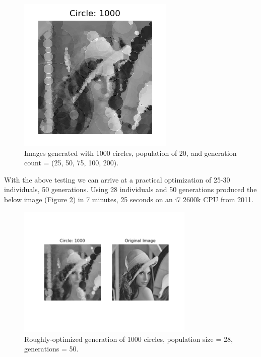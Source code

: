 \documentclass[12pt]{article}
\begin{document}
\begin{figure}[H]
\noindent\includegraphics[width=\textwidth/6]{../results/lenna/lenna_gen200}
\caption{Images generated with 1000 circles, population of 20, and generation count = (25, 50, 75, 100, 200). }
\label{fig:lenna_gen}
\end{figure}

With the above testing we can arrive at a practical optimization of 25-30 individuals, 50 generations. Using 28 individuals and 50 generations produced the below image (Figure \ref{fig:lenna_final}) in 7 minutes, 25 seconds on an i7 2600k CPU from 2011. 
\begin{figure}[H]
\centering
\centering
\noindent\includegraphics[width=0.75\textwidth]{../results/lenna/lenna_pop28_gen50}
\caption{Roughly-optimized generation of 1000 circles, population size = 28, generations = 50.}
\label{fig:lenna_final}
\end{figure}
\end{document}
